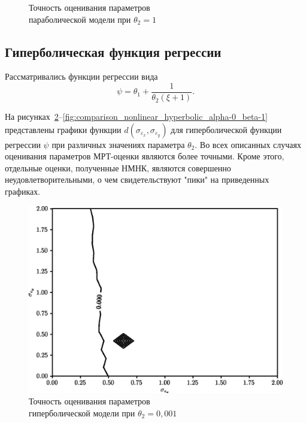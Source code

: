 \begin{figure}[p]
  \vspace{\baselineskip}
  \caption{
    Точность оценивания параметров \\
    параболической модели при \( \theta_2 = 1 \)
  }\label{fig:comparison_nonlinear_quadratic_beta-1}
\end{figure}

\subsection{Гиперболическая функция регрессии}

Рассматривались функции регрессии вида
\begin{equation*}
  \psi = \theta_1 + \dfrac{1}{\theta_2(\xi+1)}.
\end{equation*}

На рисунках~\ref{fig:comparison_nonlinear_hyperbolic_alpha-0_beta-0,001}--\ref{fig:comparison_nonlinear_hyperbolic_alpha-0_beta-1}
представлены графики функции \( d(\sigma_{\varepsilon_x}, \sigma_{\varepsilon_y}) \)
для гиперболической функции регрессии \( \psi \) при
различных значениях параметра \( \theta_2 \).
Во всех описанных случаях оценивания параметров
МРТ-оценки являются более точными.
Кроме этого, отдельные оценки, полученные НМНК,
являются совершенно неудовлетворительными,
о чем свидетельствуют "пики" на приведенных графиках.

\begin{figure}[h]
  \centering
  \includegraphics[width=135mm]{fig/nonlinear/hyperbolic/alpha-0_beta-0,001.png}
  \caption{
    Точность оценивания параметров \\
    гиперболической модели при \( \theta_2 = 0,001 \)
  }\label{fig:comparison_nonlinear_hyperbolic_alpha-0_beta-0,001}
\end{figure}

